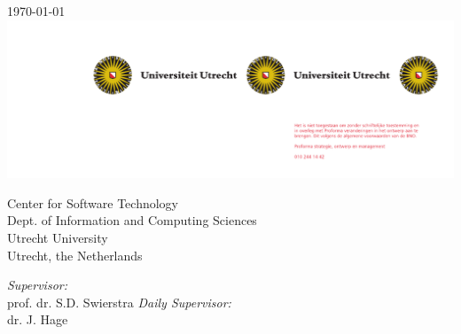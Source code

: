 \begin{titlepage}
\begin{center}
  \\[0.5CM]
  \text{\large \emph{\ }}\\[4.5CM] %
  \\[0.5cm]
  \\[0.5cm]
  \large \today\\[0.5cm]
  \vfill
  \includegraphics[scale=1.1]{resources/uusol-links}\\[1cm]
\end{center}

\begin{minipage}{0.7\textwidth}
\begin{flushleft} \large
Center for Software Technology\\
Dept. of Information and Computing Sciences\\
Utrecht University\\
Utrecht, the Netherlands
\end{flushleft}
\end{minipage}
\begin{minipage}{0.4\textwidth}
\begin{flushright} \large
\emph{Supervisor:} \\
prof. dr. S.D. Swierstra
\emph{Daily Supervisor:} \\
dr. J. Hage \\
\end{flushright}
\end{minipage}

\end{titlepage}
